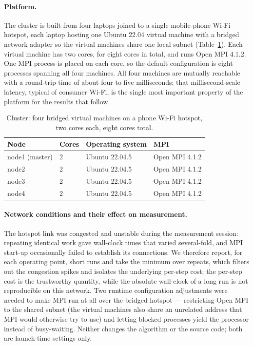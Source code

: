 \documentclass[11pt,a4paper]{article}
\begin{document}
\paragraph{Platform.}
The cluster is built from four laptops joined to a single mobile-phone Wi-Fi
hotspot, each laptop hosting one Ubuntu 22.04 virtual machine with a bridged
network adapter so the virtual machines share one local subnet
(Table~\ref{tab:cluster}). Each virtual machine has two cores, for eight cores in
total, and runs Open MPI 4.1.2. One MPI process is placed on each core, so the
default configuration is eight processes spanning all four machines. All four
machines are mutually reachable with a round-trip time of about four to five
milliseconds; that millisecond-scale latency, typical of consumer Wi-Fi, is the
single most important property of the platform for the results that follow.

\begin{table}[H]
\centering\small
\caption{Cluster: four bridged virtual machines on a phone Wi-Fi hotspot, two
cores each, eight cores total.}
\label{tab:cluster}
\begin{tabular}{@{}llll@{}}
\toprule
Node & Cores & Operating system & MPI \\
\midrule
node1 (master) & 2 & Ubuntu 22.04.5 & Open MPI 4.1.2 \\
node2          & 2 & Ubuntu 22.04.5 & Open MPI 4.1.2 \\
node3          & 2 & Ubuntu 22.04.5 & Open MPI 4.1.2 \\
node4          & 2 & Ubuntu 22.04.5 & Open MPI 4.1.2 \\
\bottomrule
\end{tabular}
\end{table}

\paragraph{Network conditions and their effect on measurement.}
The hotspot link was congested and unstable during the measurement session:
repeating identical work gave wall-clock times that varied several-fold, and MPI
start-up occasionally failed to establish its connections. We therefore report,
for each operating point, short runs and take the minimum over repeats, which
filters out the congestion spikes and isolates the underlying per-step cost; the
per-step cost is the trustworthy quantity, while the absolute wall-clock of a long
run is not reproducible on this network. Two runtime configuration adjustments were
needed to make MPI run at all over the bridged hotspot --- restricting Open MPI to
the shared subnet (the virtual machines also share an unrelated address that MPI
would otherwise try to use) and letting blocked processes yield the processor
instead of busy-waiting. Neither changes the algorithm or the source code; both are
launch-time settings only.
\end{document}
